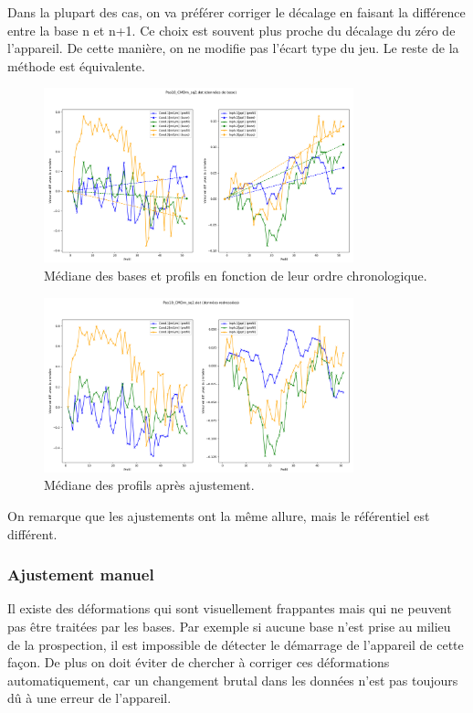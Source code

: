\documentclass[12pt]{article}
\begin{document}
    Dans la plupart des cas, on va préférer corriger le décalage en faisant la différence entre la base n et n+1. Ce choix est souvent plus proche du décalage du zéro de l'appareil. De cette manière, on ne modifie pas l'écart type du jeu. Le reste de la méthode est équivalente.

    \begin{figure}[ht!]
        \centering
        \includegraphics[width=0.8\textwidth]{Images/Base_diff_Avant_sq2.png}  
        \caption{Médiane des bases et profils en fonction de leur ordre chronologique.}
    \end{figure}

    \begin{figure}[ht!]
        \centering
        \includegraphics[width=0.8\textwidth]{Images/Base_diff_Apres_sq2.png}  
        \caption{Médiane des profils après ajustement.}
    \end{figure}

    On remarque que les ajustements ont la même allure, mais le référentiel est différent.

\subsubsection{Ajustement manuel}

    Il existe des déformations qui sont visuellement frappantes mais qui ne peuvent pas être traitées par les bases. Par exemple si aucune base n'est prise au milieu de la prospection, il est impossible de détecter le démarrage de l'appareil de cette façon. De plus on doit éviter de chercher à corriger ces déformations automatiquement, car un changement brutal dans les données n'est pas toujours dû à une erreur de l'appareil.
\end{document}

